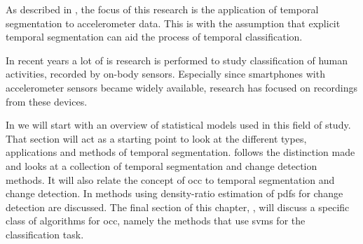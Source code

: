 

As described in , the focus of this research is the application of temporal segmentation to accelerometer data.
This is with the assumption that explicit temporal segmentation can aid the process of temporal classification.

In recent years a lot of is research is performed to study classification of human activities, recorded by on-body sensors.
Especially since smartphones with accelerometer sensors became widely available, research has focused on recordings from these devices.

In  we will start with an overview of statistical models used in this field of study.
That section will act as a starting point to look at the different types, applications and methods of temporal segmentation.
 follows the distinction made and looks at a collection of temporal segmentation and change detection methods.
It will also relate the concept of \gls{occ} to temporal segmentation and change detection.
In  methods using density-ratio estimation of \glspl{pdf} for change detection are discussed.
The final section of this chapter, , will discuss a specific class of algorithms for \gls{occ}, namely the methods that use \glspl{svm} for the classification task.

